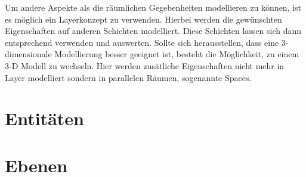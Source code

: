 \documentclass[10pt]{scrartcl}
\begin{document}
        
        Um andere Aspekte als die räumlichen Gegebenheiten modellieren zu können, ist es möglich ein Layerkonzept zu verwenden. Hierbei werden die gewünschten Eigenschaften auf anderen Schichten modelliert. Diese Schichten lassen sich dann entsprechend verwenden und auswerten.
Sollte sich herausstellen, dass eine 3-dimensionale Modellierung besser geeignet ist, besteht die Möglichkeit, zu einem 3-D Modell zu wechseln. Hier werden zusätliche Eigenschaften nicht mehr in Layer modelliert sondern in parallelen Räumen, sogenannte Spaces.

\section{Entitäten}

\section{Ebenen}
\end{document}
